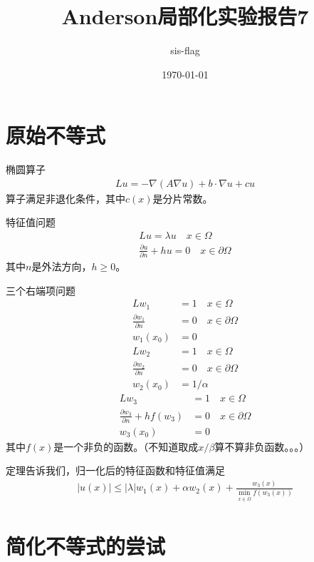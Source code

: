 \documentclass[12pt,a4paper]{article}
\title{Anderson局部化实验报告7}
\author{sis-flag}
\date{\today}
\begin{document}
\maketitle

\section*{原始不等式}

椭圆算子
\begin{align*}
L u = -\nabla (A \nabla u) + b \cdot \nabla u + c u
\end{align*}
算子满足非退化条件，其中$c(x)$是分片常数。

特征值问题
\begin{align*}
L u = \lambda u \quad x \in \Omega \\
\frac{\partial u}{\partial n} + h u = 0 \quad x \in \partial \Omega
\end{align*}
其中$n$是外法方向，$h \geq 0$。

三个右端项问题
\begin{align*}
L w_1 & = 1 \quad x \in \Omega \\
\frac{\partial w_1}{\partial n} & = 0 \quad x \in \partial \Omega \\
w_1(x_0) & = 0
\end{align*}
\begin{align*}
L w_2 & = 1 \quad x \in \Omega \\
\frac{\partial w_2}{\partial n} & = 0 \quad x \in \partial \Omega \\
w_2(x_0) & = 1/\alpha
\end{align*}
\begin{align*}
L w_3 & = 1 \quad x \in \Omega \\
\frac{\partial w_3}{\partial n} + h f(w_3) & = 0 \quad x \in \partial \Omega \\
w_3(x_0) & = 0
\end{align*}
其中$f(x)$是一个非负的函数。（不知道取成$x/\beta$算不算非负函数。。。）

定理告诉我们，归一化后的特征函数和特征值满足
\begin{align*}
|u(x)| \leq |\lambda| w_1(x) + \alpha w_2(x) + \frac{w_3(x)}{\min_{x \in \overline{\Omega}} f(w_3(x))}
\end{align*}

\section*{简化不等式的尝试}
\end{document}

